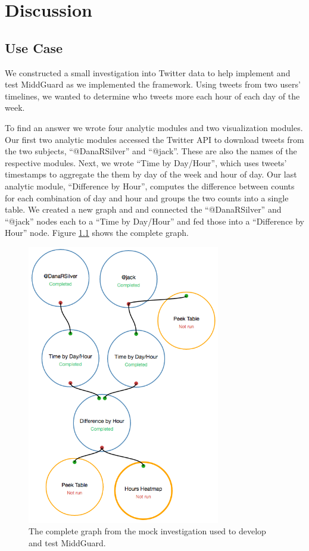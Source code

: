 \documentclass[midd]{thesis}
\begin{document}
\chapter{Discussion}

\section{Use Case}

We constructed a small investigation into Twitter data to help implement and
test MiddGuard as we implemented the framework. Using tweets from two users'
timelines, we wanted to determine who tweets more each hour of each day of the
week.

To find an answer we wrote four analytic modules and two visualization modules.
Our first two analytic modules accessed the Twitter API to download tweets from
the two subjects, ``@DanaRSilver'' and ``@jack''. These are also the names of
the respective modules. Next, we wrote ``Time by Day/Hour'', which uses tweets'
timestamps to aggregate the them by day of the week and hour of day. Our last
analytic module, ``Difference by Hour'', computes the difference between counts
for each combination of day and hour and groups the two counts into a single
table. We created a new graph and and connected the ``@DanaRSilver'' and
``@jack'' nodes each to a ``Time by Day/Hour'' and fed those into a ``Difference
by Hour'' node. Figure \ref{fig:tweetanalysisgraph} shows the complete graph.

\begin{figure}[!ht]
  \centering
  \includegraphics[width=0.75\textwidth]{tweetanalysisgraph}
  \caption{The complete graph from the mock investigation used to develop and
  test MiddGuard.}
  \label{fig:tweetanalysisgraph}
\end{figure}
\end{document}
